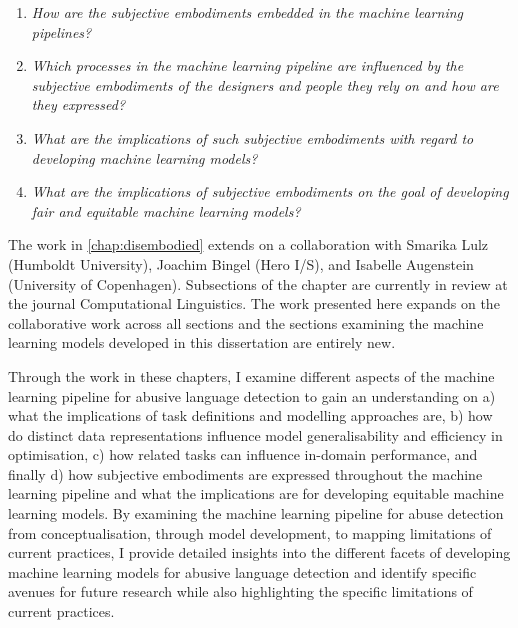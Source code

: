 \begin{center}
\begin{minipage}{0.9\textwidth}
\vspace{5mm}
    \begin{enumerate}[start=10, label={\textbf{RQ \arabic*}}]
        \item{\textit{How are the subjective embodiments embedded in the machine learning pipelines?}}
        \item{\textit{Which processes in the machine learning pipeline are influenced by the subjective embodiments of the designers and people they rely on and how are they expressed?}}
        \item{\textit{What are the implications of such subjective embodiments with regard to developing machine learning models?}}
        \item{\textit{What are the implications of subjective embodiments on the goal of developing fair and equitable machine learning models?}}
    \end{enumerate}
\vspace{5mm}
\end{minipage}
\end{center}

The work in \cref{chap:disembodied} extends on a collaboration with Smarika Lulz (Humboldt University), Joachim Bingel (Hero I/S), and Isabelle Augenstein (University of Copenhagen). Subsections of the chapter are currently in review at the journal Computational Linguistics.
The work presented here expands on the collaborative work across all sections and the sections examining the machine learning models developed in this dissertation are entirely new.

Through the work in these chapters, I examine different aspects of the machine learning pipeline for abusive language detection to gain an understanding on a) what the implications of task definitions and modelling approaches are, b) how do distinct data representations influence model generalisability and efficiency in optimisation, c) how related tasks can influence in-domain performance, and finally d) how subjective embodiments are expressed throughout the machine learning pipeline and what the implications are for developing equitable machine learning models.
By examining the machine learning pipeline for abuse detection from conceptualisation, through model development, to mapping limitations of current practices, I provide detailed insights into the different facets of developing machine learning models for abusive language detection and identify specific avenues for future research while also highlighting the specific limitations of current practices.

